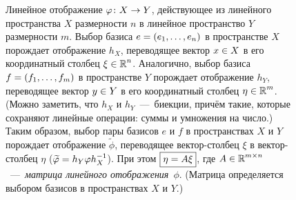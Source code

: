 \documentclass[a4paper,12pt]{article}
\begin{document}
  \begin{figure}[h]
    \centering
    
    
    \caption{Линейное отображение $\phi \hm\colon X \hm\to Y$, действующее из линейного пространства $X$ размерности $n$ в линейное пространство $Y$ размерности $m$.
      Выбор базиса $e \hm= (e_1, \ldots, e_n)$ в пространстве $X$ порождает отображение $h_X$, переводящее вектор $x \hm\in X$ в его координатный столбец $\xi \hm\in \RR^n$.
      Аналогично, выбор базиса $f \hm= (f_1, \ldots, f_m)$ в пространстве $Y$ порождает отображение $h_Y$, переводящее вектор $y \hm\in Y$ в его координатный столбец $\eta \hm\in \RR^m$.
      (Можно заметить, что $h_X$ и $h_Y$~---~биекции, причём такие, которые сохраняют линейные операции: суммы и умножения на число.)
      Таким образом, выбор пары базисов $e$ и $f$ в пространствах $X$ и $Y$ порождает отображение $\widetilde \phi$, переводящее вектор-столбец $\xi$ в вектор-столбец $\eta$ ($\widetilde \phi \hm= h_Y \phi h_X^{-1}$).
      При этом $\boxed{\eta \hm= A \xi}$, где $A \hm\in \RR^{m \times n}$~---~\emph{матрица линейного отображения}~$\phi$.
      (Матрица определяется выбором базисов в пространствах $X$ и $Y$.)
    }
    \label{fig:map-maps-map-to-map}
  \end{figure}
  
\end{document}
